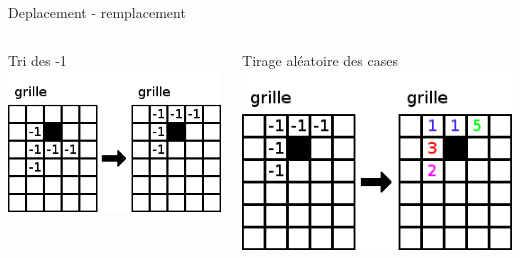 \begin{frame}{Deplacement - remplacement}
	\begin{columns}
		\begin{column}{0.49\textwidth}
			\begin{block}{Tri des -1}
				\includegraphics[width=\textwidth]{imgs/Remplacement1}
			\end{block}
		\end{column}
		\begin{column}{0.49\textwidth}
			\begin{block}{Tirage aléatoire des cases}
				\includegraphics[width=\textwidth]{imgs/Remplacement2}
			\end{block}
		\end{column}
	\end{columns}
\end{frame}
